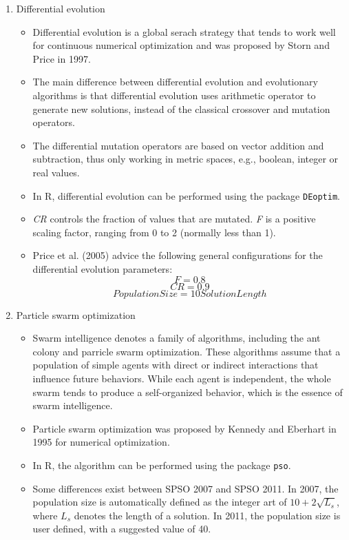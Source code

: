 \documentclass[12pt, a4paper]{article}
\begin{document}
\begin{enumerate}
 \item Differential evolution
  \begin{itemize}
   \item Differential evolution is a global serach strategy that tends to work well for continuous numerical optimization and was proposed by Storn and Price in 1997.
   \item The main difference between differential evolution and evolutionary algorithms is that differential evolution uses arithmetic operator to generate new solutions, instead of the classical crossover and mutation operators.  
   \item The differential mutation operators are based on vector addition and subtraction, thus only working in metric spaces, e.g., boolean, integer or real values.
   \item In R, differential evolution can be performed using the package \texttt{DEoptim}. 
   \item \textit{CR} controls the fraction of values that are mutated. \textit{F} is a positive scaling factor, ranging from 0 to 2 (normally less than 1). 
   \item Price et al. (2005) advice the following general configurations for the differential evolution parameters: 
   $$F=0.8$$
   $$CR=0.9$$ 
   $$PopulationSize = 10 SolutionLength$$
  \end{itemize}

 \item Particle swarm optimization
  \begin{itemize}
   \item Swarm intelligence denotes a family of algorithms, including the ant colony and parricle swarm optimization. These algorithms assume that a population of simple agents with direct or indirect interactions that influence future behaviors. While each agent is independent, the whole swarm tends to produce a self-organized behavior, which is the essence of swarm intelligence.
   \item Particle swarm optimization was proposed by Kennedy and Eberhart in 1995 for numerical optimization. 
   \item In R, the algorithm can be performed using the package \texttt{pso}.
   \item Some differences exist between SPSO 2007 and SPSO 2011. In 2007, the population size is automatically defined as the integer art of $10 + 2\sqrt{L_s}$, where $L_s$ denotes the length of a solution. In 2011, the population size is user defined, with a suggested value of 40. 
  \end{itemize}   
  

\end{enumerate}
\end{document}
